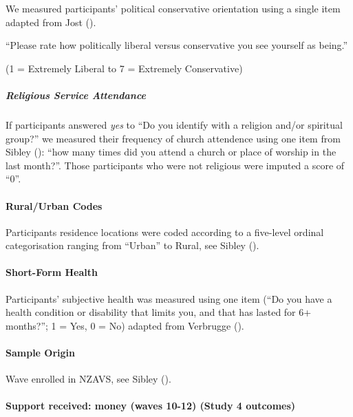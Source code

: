 \documentclass[
  single column]{article}
\let\oldparagraph\paragraph
\renewcommand{\paragraph}[1]{\oldparagraph{#1}\mbox{}}
\let\oldsubparagraph\subparagraph
\renewcommand{\subparagraph}[1]{\oldsubparagraph{#1}\mbox{}}
\begin{document}
We measured participants' political conservative orientation using a
single item adapted from Jost ().

``Please rate how politically liberal versus conservative you see
yourself as being.''

(1 = Extremely Liberal to 7 = Extremely Conservative)

\subparagraph{Religious Service
Attendance}\label{religious-service-attendance}

If participants answered \emph{yes} to ``Do you identify with a religion
and/or spiritual group?'' we measured their frequency of church
attendence using one item from Sibley ():
``how many times did you attend a church or place of worship in the last
month?''. Those participants who were not religious were imputed a score
of ``0''.

\paragraph{Rural/Urban Codes}\label{ruralurban-codes}

Participants residence locations were coded according to a five-level
ordinal categorisation ranging from ``Urban'' to Rural, see Sibley
().

\paragraph{Short-Form Health}\label{short-form-health}

Participants' subjective health was measured using one item (``Do you
have a health condition or disability that limits you, and that has
lasted for 6+ months?''; 1 = Yes, 0 = No) adapted from Verbrugge
().

\paragraph{Sample Origin}\label{sample-origin}

Wave enrolled in NZAVS, see Sibley ().

\paragraph{Support received: money (waves 10-12) (Study 4
outcomes)}\label{support-received-money-waves-10-12-study-4-outcomes}
\end{document}
